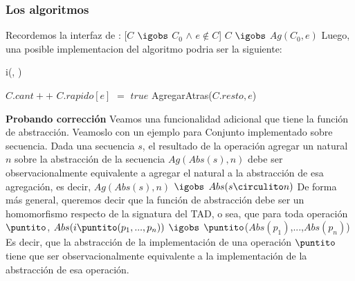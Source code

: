 \documentclass[10pt,a4paper]{article}
\begin{document}
\subsubsection{Los algoritmos}

Recordemos la interfaz de :
\newline
\newline
{}%
[$C$ $\igobs$ $C_{0}$ $\land$ $e \notin C$]
{$C$ $\igobs$ $Ag(C_{0},e)$}%
\newline
\newline
Luego, una posible implementacion del algoritmo podria ser la siguiente:

\begin{algorithm}[H]{i(, )}
	\begin{algorithmic}[1]
		\State $C.cant++$                      
		\State $C.rapido[e]$ $=$ $true$                      
		\Else
		\State AgregarAtras($C.resto,e$)                     
		\EndIf
		
		\medskip
	\end{algorithmic}
\end{algorithm}
\newpage
\textbf{Probando corrección}
\newline
\newline
Veamos una funcionalidad adicional que tiene la función de abstracción.
\newline
\newline
Veamoslo con un ejemplo para Conjunto implementado sobre secuencia.
\newline
\newline
Dada una secuencia $s$, el resultado de la operación agregar un natural $n$ sobre la abstracción de la secuencia $Ag(Abs(s),n)$ debe ser observacionalmente equivalente a agregar el natural a la abstracción de esa agregación, es decir, $Ag(Abs(s),n)$ $\igobs$ $Abs(s \circulito n)$
\newline
\newline
De forma más general, queremos decir que la función de abstracción debe ser un homomorfismo respecto de la signatura del TAD, o sea, que para toda operación $\puntito$, $Abs(i \puntito (p_{1},...,p_{n}))$ $\igobs$ $\puntito$($Abs(p_{1})$,...,$Abs(p_{n})$) 
\newline
\newline
Es decir, que la abstracción de la implementación de una operación $\puntito$ tiene que ser observacionalmente equivalente a la implementación de la abstracción de esa operación.  
\newpage
\end{document}
